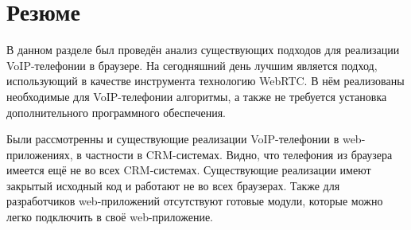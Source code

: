 \section{Резюме}

В данном разделе был проведён анализ существующих подходов для реализации VoIP-телефонии в браузере. На сегодняшний день лучшим является подход, использующий в качестве инструмента технологию WebRTC. В нём реализованы необходимые для VoIP-телефонии алгоритмы, а также не требуется установка дополнительного программного обеспечения.

Были рассмотренны и существующие реализации VoIP-телефонии в web-приложениях, в частности в CRM-системах. Видно, что телефония из браузера имеется ещё не во всех CRM-системах. Существующие реализации имеют закрытый исходный код и работают не во всех браузерах. Также для разработчиков web-приложений отсутствуют готовые модули, которые можно легко подключить в своё web-приложение.
